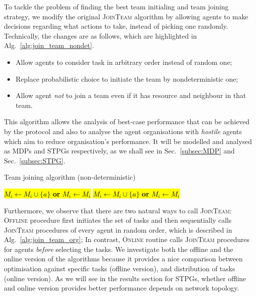 \documentclass{llncs}
\begin{document}
To tackle the problem of finding the best team initialing and team joining strategy, we modify the original \textsc{JoinTeam} algorithm by
allowing agents to make decisions regarding what actions to take, instead of picking one randomly. Technically, the changes are as follows, which
are highlighted in Alg.~\ref{alg:join_team_nondet}.
\begin{itemize}
 \item Allow agents to consider task in arbitrary order instead of random one;
 \item Replace probabilistic choice to initiate the team by nondeterministic one;
 \item Allow agent \emph{not} to join a team even if it has resource and neighbour in that team.
\end{itemize}
%
This algorithm allows the analysis of best-case performance that can be achieved by the protocol and also to analyse the agent organisations with \emph{hostile} agents which aim to reduce organisation's performance. It will be modelled and analysed as MDPs and STPGs respectively, as we shall see in Sec.~\ref{subsec:MDP} and Sec.~\ref{subsec:STPG}.
\vspace{-6mm}
\begin{algorithm}[H]
\caption{Team joining algorithm (non-deterministic)}
\label{alg:join_team_nondet}
\begin{scriptsize}
\begin{algorithmic}
     
       
	 
	    \State \hl{$M_i \leftarrow M_i \cup \{a\}$  \textbf{or} $M_i \leftarrow M_i$} 
	\EndIf
       
	 
	  \State \hl{$M_i \leftarrow M_i \cup \{a\}$ \textbf{or} $M_i \leftarrow M_i$} 
	\EndIf
      \EndIf
    \EndIf
  \EndFor
\EndProcedure
\end{algorithmic}
\end{scriptsize}
\end{algorithm}
\vspace{-6mm}
Furthermore, we observe that there are two natural ways to call \textsc{JoinTeam}: \textsc{Offline} procedure first initiates the set of tasks and then sequentially calls \textsc{JoinTeam} procedures of every agent in random order, which is described in Alg.~\ref{alg:join_team_org}; In contrast, \textsc{Online} routine calls \textsc{JoinTeam} procedures for agents \emph{before} selecting the tasks. We investigate both the offline and the online version of the algorithms because it provides a nice comparison between optimisation against specific tasks (offline version), and distribution of tasks (online version). As we will see in the results section for STPGs, whether offline and online version provides better performance depends on network topology.
\vspace{-6mm}
\end{document}
